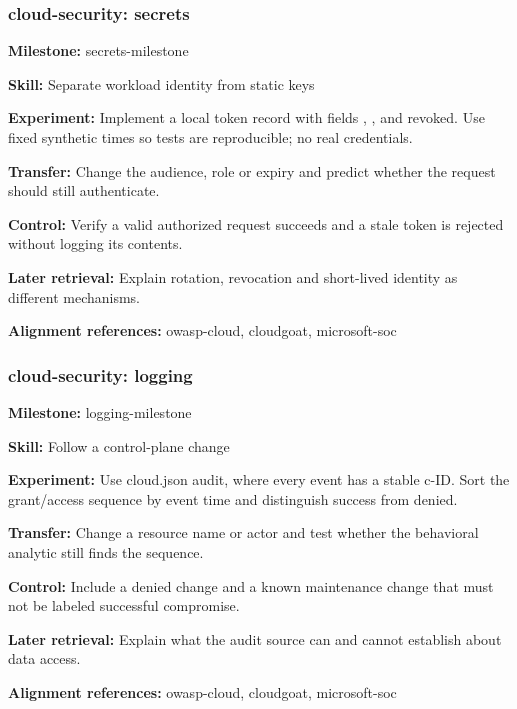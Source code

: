 \subsubsection{cloud-security: secrets}
\noindent\textbf{Milestone:} secrets-milestone\par
\noindent\textbf{Skill:} Separate workload identity from static keys\par
\noindent\textbf{Experiment:} Implement a local token record with fields , ,  and revoked. Use fixed synthetic times so tests are reproducible; no real credentials.\par
\noindent\textbf{Transfer:} Change the audience, role or expiry and predict whether the request should still authenticate.\par
\noindent\textbf{Control:} Verify a valid authorized request succeeds and a stale token is rejected without logging its contents.\par
\noindent\textbf{Later retrieval:} Explain rotation, revocation and short-lived identity as different mechanisms.\par
\noindent\textbf{Alignment references:} owasp-cloud, cloudgoat, microsoft-soc\par
\subsubsection{cloud-security: logging}
\noindent\textbf{Milestone:} logging-milestone\par
\noindent\textbf{Skill:} Follow a control-plane change\par
\noindent\textbf{Experiment:} Use cloud.json audit, where every event has a stable c-ID. Sort the grant/access sequence by event time and distinguish success from denied.\par
\noindent\textbf{Transfer:} Change a resource name or actor and test whether the behavioral analytic still finds the sequence.\par
\noindent\textbf{Control:} Include a denied change and a known maintenance change that must not be labeled successful compromise.\par
\noindent\textbf{Later retrieval:} Explain what the audit source can and cannot establish about data access.\par
\noindent\textbf{Alignment references:} owasp-cloud, cloudgoat, microsoft-soc\par
